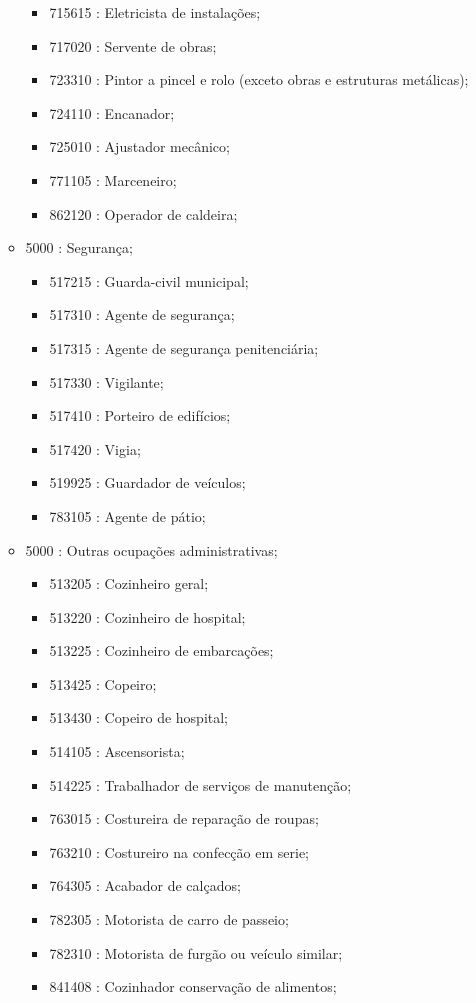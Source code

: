 \begin{itemize}
\begin{itemize}
\begin{itemize}
      \item 715615 : Eletricista de instalações;
      \item 717020 : Servente de obras;
      \item 723310 : Pintor a pincel e rolo (exceto obras e estruturas metálicas);
      \item 724110 : Encanador;
      \item 725010 : Ajustador mecânico;
      \item 771105 : Marceneiro;
      \item 862120 : Operador de caldeira;
    \end{itemize}
    \item 5000 : Segurança;
    \begin{itemize}
      \item 517215 : Guarda-civil municipal;
      \item 517310 : Agente de segurança;
      \item 517315 : Agente de segurança penitenciária;
      \item 517330 : Vigilante;
      \item 517410 : Porteiro de edifícios;
      \item 517420 : Vigia;
      \item 519925 : Guardador de veículos;
      \item 783105 : Agente de pátio;
    \end{itemize}
    \item 5000 : Outras ocupações administrativas;
    \begin{itemize}
      \item 513205 : Cozinheiro geral;
      \item 513220 : Cozinheiro de hospital;
      \item 513225 : Cozinheiro de embarcações;
      \item 513425 : Copeiro;
      \item 513430 : Copeiro de hospital;
      \item 514105 : Ascensorista;
      \item 514225 : Trabalhador de serviços de manutenção;
      \item 763015 : Costureira de reparação de roupas;
      \item 763210 : Costureiro na confecção em serie;
      \item 764305 : Acabador de calçados;
      \item 782305 : Motorista de carro de passeio;
      \item 782310 : Motorista de furgão ou veículo similar;
      \item 841408 : Cozinhador conservação de alimentos;
    \end{itemize}
  \end{itemize}
\end{itemize}
